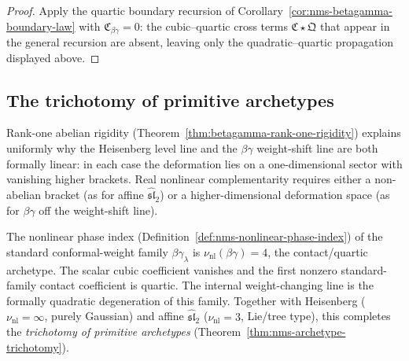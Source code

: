 \begin{proof}
Apply the quartic boundary recursion
of Corollary~\ref{cor:nms-betagamma-boundary-law} with
$\mathfrak{C}_{\beta\gamma} = 0$: the cubic--quartic cross terms
$\mathfrak{C} \star \mathfrak{Q}$ that appear in the general recursion
are absent, leaving only the quadratic--quartic propagation displayed
above.\qedhere
\end{proof}

\subsection{The trichotomy of primitive archetypes}

\begin{remark}
\label{rem:betagamma-uniform-linearity}
Rank-one abelian rigidity
(Theorem~\ref{thm:betagamma-rank-one-rigidity}) explains uniformly why
the Heisenberg level line and the $\beta\gamma$ weight-shift line are
both formally linear: in each case the deformation lies on a
one-dimensional sector with vanishing higher brackets. Real nonlinear
complementarity requires either a non-abelian bracket (as for affine
$\widehat{\mathfrak{sl}}_2$) or a higher-dimensional deformation space
(as for $\beta\gamma$ off the weight-shift line).
\end{remark}

\begin{remark}
\label{rem:betagamma-phase-index}
The nonlinear phase index
(Definition~\ref{def:nms-nonlinear-phase-index}) of the standard
conformal-weight family $\beta\gamma_\lambda$ is
$\nu_{\mathrm{nl}}(\beta\gamma) = 4$, the contact/quartic archetype.
The scalar cubic coefficient vanishes and the first nonzero
standard-family contact coefficient is quartic. The internal
weight-changing line is the formally quadratic degeneration of this
family.
Together with Heisenberg ($\nu_{\mathrm{nl}} = \infty$, purely
Gaussian) and affine $\widehat{\mathfrak{sl}}_2$
($\nu_{\mathrm{nl}} = 3$, Lie/tree type), this completes the
\emph{trichotomy of primitive archetypes}
(Theorem~\ref{thm:nms-archetype-trichotomy}).
\end{remark}

